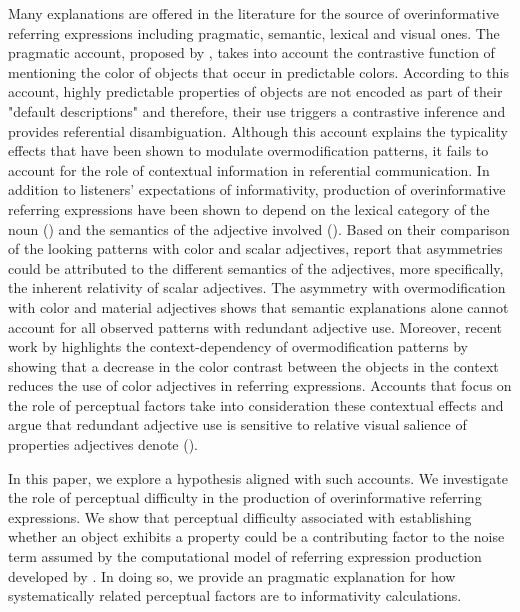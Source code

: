 \documentclass[12pt,letterpaper]{article}
\begin{document}
Many explanations are offered in the literature for the source of overinformative referring expressions including pragmatic, semantic, lexical and visual ones. The pragmatic account, proposed by \citet{Sedivy2003}, takes into account the contrastive function of mentioning the color of objects that occur in predictable colors. According to this account, highly predictable properties of objects are not encoded as part of their "default descriptions" and therefore, their use triggers a contrastive inference and provides referential disambiguation. Although this account explains the typicality effects that have been shown to modulate overmodification patterns, it fails to account for the role of contextual information in referential communication. In addition to listeners' expectations of informativity, production of overinformative referring expressions have been shown to depend on the lexical category of the noun (\citealt{RubioFernandez2016}) and the semantics of the adjective involved (\citealt{RubioEtAl2019, Sedivy2003}). Based on their comparison of the looking patterns with color and scalar adjectives, \citet{AparicioEtAl2018} report that asymmetries could be attributed to the different semantics of the adjectives, more specifically, the inherent relativity of scalar adjectives. The asymmetry with overmodification with color and material adjectives shows that semantic explanations alone cannot account for all observed patterns with redundant adjective use. Moreover, recent work by \citet{ViethenEtAl2017} highlights the context-dependency of overmodification patterns by showing that a decrease in the color contrast between the objects in the context reduces the use of color adjectives in referring expressions. Accounts that focus on the role of perceptual factors take into consideration these contextual effects and argue that redundant adjective use is sensitive to relative visual salience of properties adjectives denote (\citealt{RubioEtAl2019, Taranskeen2015}). 

In this paper, we explore a hypothesis aligned with such accounts. We investigate the role of perceptual difficulty in the production of overinformative referring expressions. We show that perceptual difficulty associated with establishing whether an object exhibits a property could be a contributing factor to the noise term assumed by the computational model of referring expression production developed by \citet{DegenEtAl2020}. In doing so, we provide an pragmatic explanation for how systematically related perceptual factors are to informativity calculations.
\end{document}
